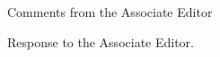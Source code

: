 \editor
\begin{generalcomment}
Comments from the Associate Editor
\end{generalcomment}
\begin{revmeta}[]
Response to the Associate Editor.

\end{revmeta}


